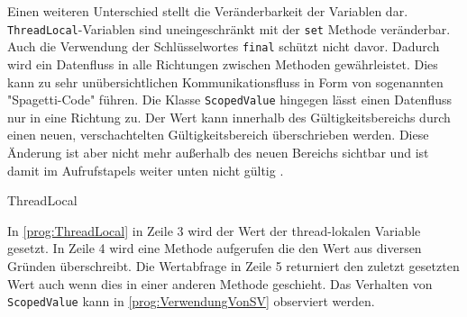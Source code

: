     Einen weiteren Unterschied stellt die Veränderbarkeit der Variablen dar. \texttt{ThreadLocal}-Variablen sind uneingeschränkt mit der \texttt{set} Methode veränderbar.
    Auch die Verwendung der Schlüsselwortes \texttt{final} schützt nicht davor. Dadurch wird ein Datenfluss in alle Richtungen zwischen Methoden gewährleistet. Dies kann zu sehr unübersichtlichen 
    Kommunikationsfluss in Form von sogenannten "Spagetti-Code" führen. Die Klasse \texttt{ScopedValue} hingegen lässt einen Datenfluss nur in eine Richtung zu. Der Wert kann innerhalb des 
    Gültigkeitsbereichs durch einen neuen, verschachtelten Gültigkeitsbereich überschrieben werden. Diese Änderung ist aber nicht mehr außerhalb des neuen Bereichs sichtbar und ist damit im Aufrufstapels weiter
    unten nicht gültig \cite{JEP481}.
    \begin{program} [H]
        \caption{ThreadLocal}
        \label{prog:ThreadLocal}
    \begin{JavaCode}[language=Java, numbers=left]
static ThreadLocal<String> threadLokal = new ThreadLocal<>();
public static void main(String[] args) {
    threadLokal.set("the negative side of Threadlocal");
    printHello();
    System.out.println(STR."This is a Methode to show \{threadLokal.get()}");
    threadLokal.remove();
}

public static void printHello() {
    threadLokal.set(Thread.currentThread().toString());
    System.out.println(STR."Hello from \{threadLokal.get()}");
}\end{JavaCode}
    \end{program}
    In \ref{prog:ThreadLocal} in Zeile 3 wird der Wert der thread-lokalen Variable gesetzt. In Zeile 4 wird eine Methode aufgerufen die den Wert aus diversen Gründen überschreibt. Die Wertabfrage in Zeile 5
    returniert den zuletzt gesetzten Wert auch wenn dies in einer anderen Methode geschieht. Das Verhalten von \texttt{ScopedValue} kann in \ref{prog:VerwendungVonSV} observiert werden.







